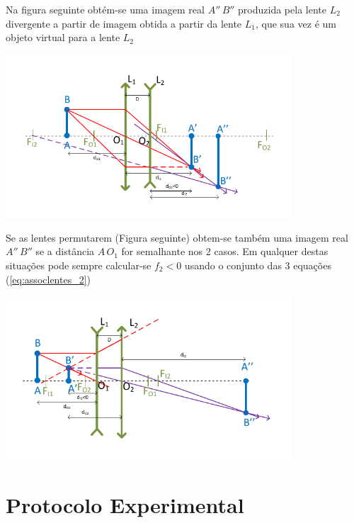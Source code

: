 \documentclass[a4paper,12pt]{article}      %
\begin{document}
Na figura seguinte obtém-se uma imagem real $A''\,B''$ produzida pela lente $L_2$ divergente a partir de imagem  obtida a partir da lente $L_1$, que sua vez é um objeto virtual para a lente $L_2$

\begin{center}
	\includegraphics[width=0.8\textwidth]{ConverDiverg_II}
\end{center}



Se as lentes permutarem (Figura seguinte) obtem-se também uma imagem real  $A''\,B''$ se a distância $A\,O_1$ for semalhante nos 2 casos.
Em qualquer destas situações pode sempre calcular-se $f_2 < 0$ usando o conjunto das 3 equações (\ref{eq:assoclentes_2})

\begin{center}
	\includegraphics[width=0.8\textwidth]{ConverDiverg_III}
\end{center}



\newpage
\section{\sf Protocolo Experimental}
\end{document}
